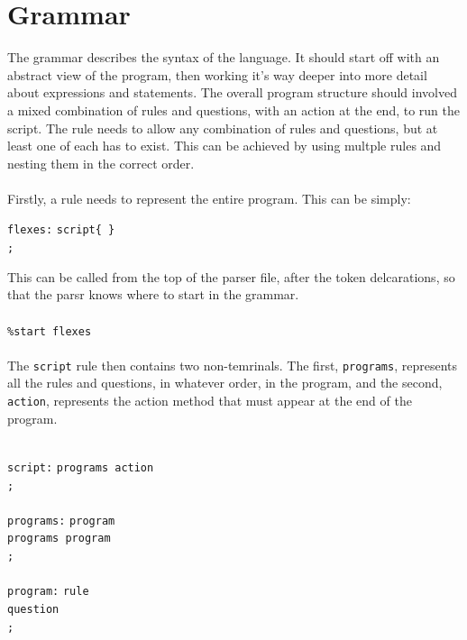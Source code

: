 \documentclass[12pt]{report}
\begin{document}
\section{Grammar}\label{sec:grammar}
The grammar describes the syntax of the language.  It should start off with an abstract view of the program, then working it's way deeper into more detail about expressions and statements.  The overall program structure should involved a mixed combination of rules and questions, with an action at the end, to run the script.  The rule needs to allow any combination of rules and questions, but at least one of each has to exist.  This can be achieved by using multple rules and nesting them in the correct order.\\
\\
Firstly, a rule needs to represent the entire program.  This can be simply:\\
\begin{tabbing}
	\texttt{flexes:} \= \texttt{script\quad\quad\{ \}}\\
	\> \texttt{;}\\
\end{tabbing}
This can be called from the top of the parser file, after the token delcarations, so that the parsr knows where to start in the grammar.\\
\\
\texttt{\%start flexes}\\
\\
The \texttt{script} rule then contains two non-temrinals.  The first, \texttt{programs}, represents all the rules and questions, in whatever order, in the program, and the second, \texttt{action}, represents the action method that must appear at the end of the program.\\
\\
\begin{tabbing}
	\texttt{script:} \= \texttt{programs action}\\
	\> \texttt{;}\\
	\\
	\texttt{programs:} \= \texttt{program}\\
	\> \texttt{\textbar \space programs program}\\
	\> \texttt{;}\\
	\\
	\texttt{program:} \= \texttt{rule}\\
	\> \texttt{\textbar \space question}\\
	\> \texttt{;}\\
\end{tabbing}
\end{document}
